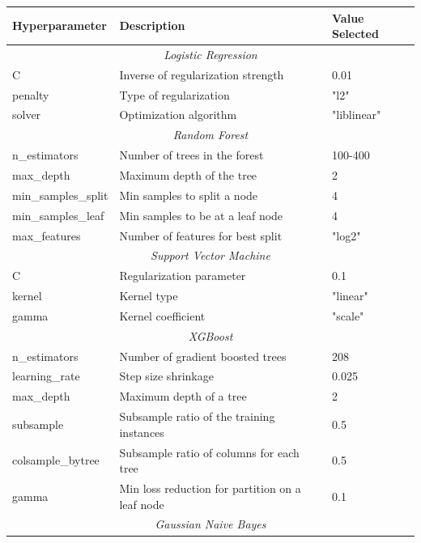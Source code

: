  \begin{table}[h]
	\centering
	\small
	\begin{adjustbox}{center}
		\begin{tabular}{|l|l|l|}
			\hline
			\rule{0pt}{2.5ex}\textbf{Hyperparameter} & \textbf{Description} & \textbf{Value Selected} \\
			\hline
			\multicolumn{3}{|c|}{\rule{0pt}{2.5ex}\textit{Logistic Regression}} \\
			\hline
			C & Inverse of regularization strength & 0.01 \\
			penalty & Type of regularization & "l2" \\
			solver & Optimization algorithm & "liblinear" \\
			\hline
			\multicolumn{3}{|c|}{\rule{0pt}{2.5ex}\textit{Random Forest}} \\
			\hline
			n\_estimators & Number of trees in the forest & 100-400 \\
			max\_depth & Maximum depth of the tree & 2 \\
			min\_samples\_split & Min samples to split a node & 4 \\
			min\_samples\_leaf & Min samples to be at a leaf node & 4 \\
			max\_features & Number of features for best split & "log2" \\
			\hline
			\multicolumn{3}{|c|}{\rule{0pt}{2.5ex}\textit{Support Vector Machine}} \\
			\hline
			C & Regularization parameter & 0.1 \\
			kernel & Kernel type & "linear" \\
			gamma & Kernel coefficient & "scale" \\
			\hline
			\multicolumn{3}{|c|}{\rule{0pt}{2.5ex}\textit{XGBoost}} \\
			\hline
			n\_estimators & Number of gradient boosted trees & 208 \\
			learning\_rate & Step size shrinkage & 0.025 \\
			max\_depth & Maximum depth of a tree & 2 \\
			subsample & Subsample ratio of the training instances & 0.5 \\
			colsample\_bytree & Subsample ratio of columns for each tree & 0.5 \\
			gamma & Min loss reduction for partition on a leaf node & 0.1 \\
			\hline
			\multicolumn{3}{|c|}{\rule{0pt}{2.5ex}\textit{Gaussian Naive Bayes}} \\

\end{tabular}
\end{adjustbox}
\end{table}
